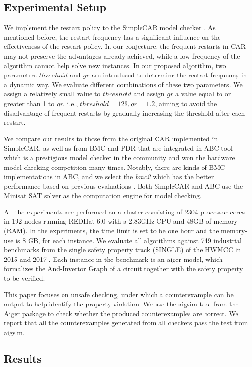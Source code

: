 \subsection{Experimental Setup}
We implement the restart policy to the SimpleCAR model checker \cite{}. As mentioned before, the restart frequency has a significant influence on the effectiveness of the restart policy. In our conjecture, the frequent restarts in CAR may not preserve the advantages already achieved, while a low frequency of the algorithm cannot help solve new instances. In our proposed algorithm, two parameters $threshold$ and $gr$ are introduced to determine the restart frequency in a dynamic way. We evaluate different combinations of these two parameters. We assign a relatively small value to $threshold$ and assign $gr$ a value equal to or greater than 1 to $gr$, i.e., $threshold = 128, gr = 1.2$, aiming to avoid the disadvantage of frequent restarts by gradually increasing the threshold after each restart. 

We compare our results to those from the original CAR implemented in SimpleCAR, as well as from BMC and PDR that are integrated in ABC tool \cite{}, which is a prestigious model checker in the community and won the hardware model checking competition many times. Notably, there are kinds of BMC implementations in ABC, and we select the \emph{bmc2} which has the better performance based on previous evaluations \cite{}. Both SimpleCAR and ABC use the Minisat SAT solver \cite{} as the computation engine for model checking. 

All the experiments are performed on a cluster consisting of 2304 processor cores in 192 nodes running REDHat 6.0 with a 2.83GHz CPU and 48GB of memory (RAM). In the experiments, the time limit is set to be one hour and the memory-use is 8 GB, for each instance.
We evaluate all algorithms against 749 industrial benchmarks from the single safety property track (SINGLE) of the HWMCC in 2015 \cite{} and 2017 \cite{}. Each instance in the benchmark is an aiger model, which formalizes the And-Invertor Graph \cite{} of a circuit together with the safety property to be verified. 

This paper focuses on unsafe checking, under which a counterexample can be output to help identify the property violation. We use the aigsim tool from the Aiger package \cite{} to check whether the produced counterexamples are correct. We report that all the counterexamples generated from all checkers pass the test from aigsim.

\subsection{Results}


